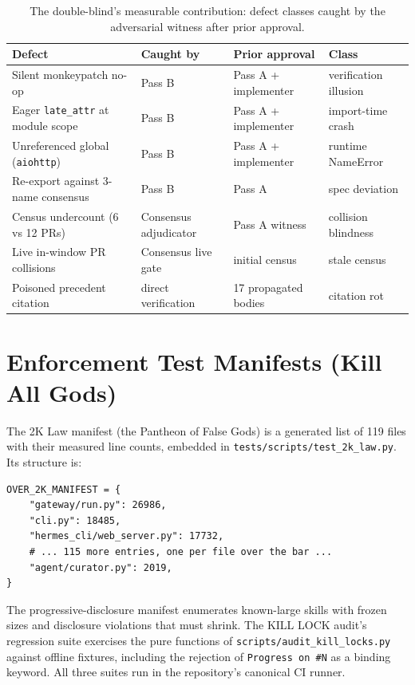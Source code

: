 \documentclass[11pt]{article}
\theoremstyle{definition}
\theoremstyle{plain}
\theoremstyle{remark}
\begin{document}
\begin{table}[H]
\centering
\caption{The double-blind's measurable contribution: defect classes caught
by the adversarial witness after prior approval.}
\label{tab:defects}
\begin{tabular}{@{}llll@{}}
\toprule
Defect & Caught by & Prior approval & Class \\
\midrule
Silent monkeypatch no-op & Pass B & Pass A + implementer & verification illusion \\
Eager \texttt{late\_attr} at module scope & Pass B & Pass A + implementer & import-time crash \\
Unreferenced global (\texttt{aiohttp}) & Pass B & Pass A + implementer & runtime NameError \\
Re-export against 3-name consensus & Pass B & Pass A & spec deviation \\
Census undercount (6 vs 12 PRs) & Consensus adjudicator & Pass A witness & collision blindness \\
Live in-window PR collisions & Consensus live gate & initial census & stale census \\
Poisoned precedent citation & direct verification & 17 propagated bodies & citation rot \\
\bottomrule
\end{tabular}
\end{table}

\section{Enforcement Test Manifests (Kill All Gods)}
\label{app:kag-manifests}

The 2K Law manifest (the Pantheon of False Gods) is a generated list of 119
files with their measured line counts, embedded in
\texttt{tests/scripts/test\_2k\_law.py}. Its structure is:

\begin{verbatim}
OVER_2K_MANIFEST = {
    "gateway/run.py": 26986,
    "cli.py": 18485,
    "hermes_cli/web_server.py": 17732,
    # ... 115 more entries, one per file over the bar ...
    "agent/curator.py": 2019,
}
\end{verbatim}

The progressive-disclosure manifest enumerates known-large skills with
frozen sizes and disclosure violations that must shrink. The KILL LOCK
audit's regression suite exercises the pure functions of
\texttt{scripts/audit\_kill\_locks.py} against offline fixtures, including
the rejection of \texttt{Progress on \#N} as a binding keyword. All three
suites run in the repository's canonical CI runner.
\end{document}
